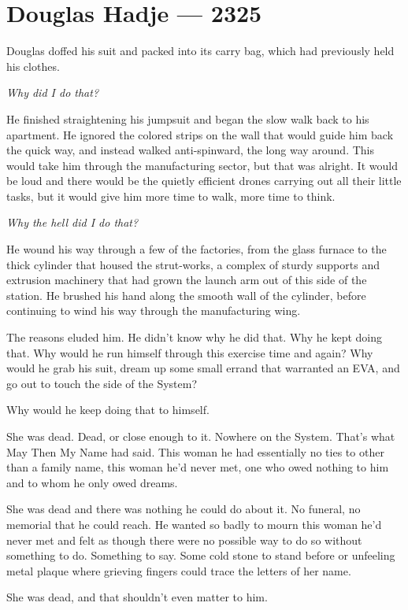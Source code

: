 \hypertarget{douglas-hadje-2325}{%
\chapter{Douglas Hadje — 2325}\label{douglas-hadje-2325}}

Douglas doffed his suit and packed into its carry bag, which had previously held his clothes.

\emph{Why did I do that?}

He finished straightening his jumpsuit and began the slow walk back to his apartment. He ignored the colored strips on the wall that would guide him back the quick way, and instead walked anti-spinward, the long way around. This would take him through the manufacturing sector, but that was alright. It would be loud and there would be the quietly efficient drones carrying out all their little tasks, but it would give him more time to walk, more time to think.

\emph{Why the hell did I do that?}

He wound his way through a few of the factories, from the glass furnace to the thick cylinder that housed the strut-works, a complex of sturdy supports and extrusion machinery that had grown the launch arm out of this side of the station. He brushed his hand along the smooth wall of the cylinder, before continuing to wind his way through the manufacturing wing.

The reasons eluded him. He didn't know why he did that. Why he kept doing that. Why would he run himself through this exercise time and again? Why would he grab his suit, dream up some small errand that warranted an EVA, and go out to touch the side of the System?

Why would he keep doing that to himself.

She was dead. Dead, or close enough to it. Nowhere on the System. That's what May Then My Name had said. This woman he had essentially no ties to other than a family name, this woman he'd never met, one who owed nothing to him and to whom he only owed dreams.

She was dead and there was nothing he could do about it. No funeral, no memorial that he could reach. He wanted so badly to mourn this woman he'd never met and felt as though there were no possible way to do so without something to do. Something to say. Some cold stone to stand before or unfeeling metal plaque where grieving fingers could trace the letters of her name.

She was dead, and that shouldn't even matter to him.

